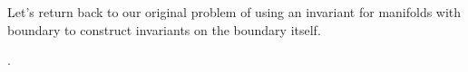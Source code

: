 

Let's return back to our original problem of using an invariant for manifolds with boundary to construct invariants on the boundary itself.


\bigskip

\begin{remark}
 \cite{witten1985global}.
\end{remark}


